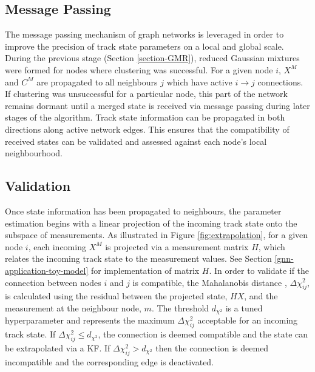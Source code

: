 \subsection{Message Passing}
The message passing mechanism of graph networks is leveraged in order to improve the precision of track state parameters on a local and global scale. During the previous stage (Section \ref{section-GMR}), reduced Gaussian mixtures were formed for nodes where clustering was successful. For a given node $i$, $X^M$ and $C^M$ are propagated to all neighbours $j$ which have active $i \rightarrow j$ connections. If clustering was unsuccessful for a particular node, this part of the network remains dormant until a merged state is received via message passing during later stages of the algorithm. Track state information can be propagated in both directions along active network edges. This ensures that the compatibility of received states can be validated and assessed against each node's local neighbourhood.


\subsection{Validation}
Once state information has been propagated to neighbours, the parameter estimation begins with a linear projection of the incoming track state onto the subspace of measurements. As illustrated in Figure \ref{fig:extrapolation}, for a given node $i$, each incoming $X^M$ is projected via a measurement matrix $H$, which relates the incoming track state to the measurement values. See Section \ref{gnn-application-toy-model} for implementation of matrix $H$. In order to validate if the connection between nodes $i$ and $j$ is compatible, the Mahalanobis distance \cite{mahalanobis-distance}, $\Delta \chi^{2}_{ij}$, is calculated using the residual between the projected state, $HX$, and the measurement at the neighbour node, $m$. The threshold $d_{\chi^{2}}$ is a tuned hyperparameter and represents the maximum $\Delta \chi^{2}_{ij}$ acceptable for an incoming track state. If $\Delta \chi^{2}_{ij} \leq d_{\chi^{2}}$, the connection is deemed compatible and the state can be extrapolated via a KF. If $\Delta \chi^{2}_{ij} > d_{\chi^{2}}$ then the connection is deemed incompatible and the corresponding edge is deactivated.

